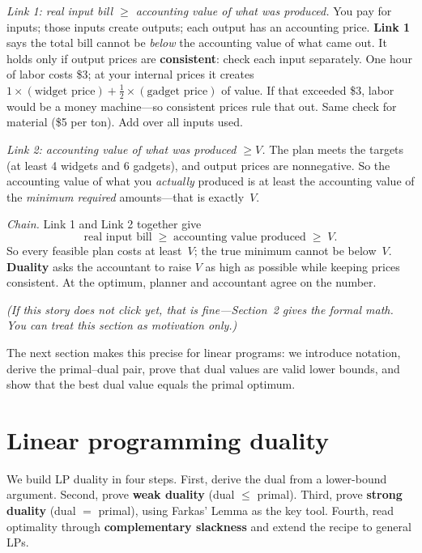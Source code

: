 \documentclass[11pt,a4paper]{article}
\begin{document}
\emph{Link 1: real input bill $\ge$ accounting value of what was produced.}
You pay for inputs; those inputs create outputs; each output has an accounting price.
\textbf{Link 1} says the total bill cannot be \emph{below} the accounting value of what came out.
It holds only if output prices are \textbf{consistent}: check each input separately.
One hour of labor costs \$3; at your internal prices it creates
$1\times(\text{widget price}) + \tfrac12\times(\text{gadget price})$ of value.
If that exceeded \$3, labor would be a money machine---so consistent prices rule that out.
Same check for material (\$5 per ton). Add over all inputs used.

\emph{Link 2: accounting value of what was produced $\ge V$.}
The plan meets the targets (at least 4 widgets and 6 gadgets), and output prices are nonnegative.
So the accounting value of what you \emph{actually} produced is at least the accounting value of the
\emph{minimum required} amounts---that is exactly~$V$.

\emph{Chain.}
Link 1 and Link 2 together give
\[
  \text{real input bill}
  \;\ge\;
  \text{accounting value produced}
  \;\ge\;
  V.
\]
So every feasible plan costs at least~$V$; the true minimum cannot be below~$V$.
\textbf{Duality} asks the accountant to raise $V$ as high as possible while keeping prices consistent.
At the optimum, planner and accountant agree on the number.

\smallskip
\noindent\emph{(If this story does not click yet, that is fine---Section~2 gives the formal math.
You can treat this section as motivation only.)}

The next section makes this precise for linear programs: we introduce notation, derive the primal--dual pair,
prove that dual values are valid lower bounds, and show that the best dual value equals the primal optimum.

\section{Linear programming duality}

We build LP duality in four steps.
First, derive the dual from a lower-bound argument.
Second, prove \textbf{weak duality} (dual $\le$ primal).
Third, prove \textbf{strong duality} (dual $=$ primal), using Farkas' Lemma as the key tool.
Fourth, read optimality through \textbf{complementary slackness} and extend the recipe to general LPs.
\end{document}
